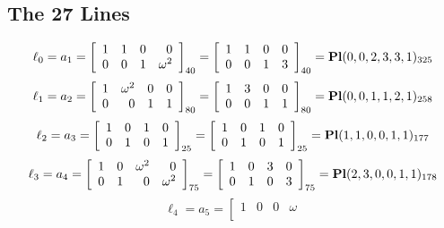 \documentclass{article}
\begin{document}
{\subsection*{The 27 Lines}
$$
\ell_{0} = a_{1} = 
\left[
\begin{array}{*{4}{r}}
1 & 1 & 0 & 0\\
0 & 0 & 1 & \omega^{2}\\
\end{array}
\right]
_{40}
=
\left[
\begin{array}{*{4}c}
1  & 1  & 0  & 0\\
0  & 0  & 1  & 3\\
\end{array}
\right]_{40}
={\rm\bf Pl}(0,0,2,3,3,1 )_{325}$$
$$
\ell_{1} = a_{2} = 
\left[
\begin{array}{*{4}{r}}
1 & \omega^{2} & 0 & 0\\
0 & 0 & 1 & 1\\
\end{array}
\right]
_{80}
=
\left[
\begin{array}{*{4}c}
1  & 3  & 0  & 0\\
0  & 0  & 1  & 1\\
\end{array}
\right]_{80}
={\rm\bf Pl}(0,0,1,1,2,1 )_{258}$$
$$
\ell_{2} = a_{3} = 
\left[
\begin{array}{*{4}{r}}
1 & 0 & 1 & 0\\
0 & 1 & 0 & 1\\
\end{array}
\right]
_{25}
=
\left[
\begin{array}{*{4}c}
1  & 0  & 1  & 0\\
0  & 1  & 0  & 1\\
\end{array}
\right]_{25}
={\rm\bf Pl}(1,1,0,0,1,1 )_{177}$$
$$
\ell_{3} = a_{4} = 
\left[
\begin{array}{*{4}{r}}
1 & 0 & \omega^{2} & 0\\
0 & 1 & 0 & \omega^{2}\\
\end{array}
\right]
_{75}
=
\left[
\begin{array}{*{4}c}
1  & 0  & 3  & 0\\
0  & 1  & 0  & 3\\
\end{array}
\right]_{75}
={\rm\bf Pl}(2,3,0,0,1,1 )_{178}$$
$$
\ell_{4} = a_{5} = 
\left[
\begin{array}{*{4}{r}}
1 & 0 & 0 & \omega \\

\end{array}$$}
\end{document}
